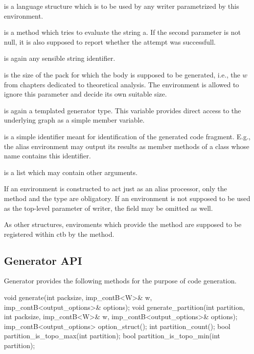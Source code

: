 \begin{description}
\item {} is a language structure which is to be used by any writer parametrized by this environment.
\item {} is a method which tries to evaluate the string a. If the second parameter is not null, it is also supposed to report whether the attempt was successfull.
\item {} is again any sensible string identifier.
\item {}
  \begin{description}
    \item {} is the size of the pack for which the body is supposed to be generated, i.e., the $w$ from chapters dedicated to theoretical analysis. The environment is allowed to ignore this parameter and decide its own suitable size.
    \item {} is again a templated generator type. This variable provides direct access to the underlying graph as a simple member variable.
    \item {} is a simple identifier meant for identification of the generated code fragment. E.g., the alias environment may output its results as member methods of a class whose name contains this identifier.
    \item {} is a list which may contain other arguments.
  \end{description}
\end{description}

If an environment is constructed to act just as an alias processor, only the  method and the  type are obligatory. If an environment is not supposed to be used as the top-level parameter of writer, the  field may be omitted as well.

As other structures, enviroments which provide the  method are supposed to be registered within ctb by the  method.

\subsection{Generator API}

Generator provides the following methods for the purpose of code generation. 

\begin{code}
void generate(int packsize, 
    imp_contB<W>& w, imp_contB<output_options>& options); 
void generate_partition(int partition, int packsize, 
    imp_contB<W>& w, imp_contB<output_options>& options);
imp_contB<output_options> option_struct();
int partition_count();
bool partition_is_topo_max(int partition);
bool partition_is_topo_min(int partition);
\end{code}

